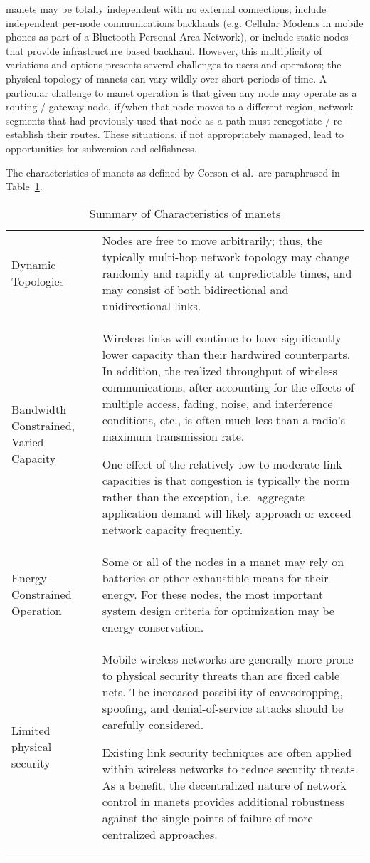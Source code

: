 \glspl{manet} may be totally independent with no external connections; include independent per-node communications backhauls (e.g. Cellular Modems in mobile phones as part of a Bluetooth Personal Area Network), or include static nodes that provide infrastructure based backhaul.
However, this multiplicity of variations and options presents several challenges to users and operators; the physical topology of \glspl{manet} can vary wildly over short periods of time.
A particular challenge to \gls{manet} operation is that given any node may operate as a routing / gateway node, if/when that node moves to a different region, network segments that had previously used that node as a path must renegotiate / re-establish their routes.
These situations, if not appropriately managed, lead to opportunities for subversion and selfishness.

The characteristics of \gls{manet}s as defined by Corson et al.\ are paraphrased in Table~\ref{tab:manet_characteristics}.

\begin{table}[h!]
\caption[Summary of Characteristics of \glspl{manet}]{Summary of Characteristics of \glspl{manet}\cite{Corson1999}}
\label{tab:manet_characteristics}
  \begin{tabularx}{\textwidth}{p{2cm}X}\toprule
    Dynamic Topologies & Nodes are free to move arbitrarily; thus, the typically multi-hop network topology may change randomly and rapidly at unpredictable times, and may consist of both bidirectional and unidirectional links.
\\
    Bandwidth Constrained, Varied Capacity & Wireless links will continue to have significantly lower capacity than their hardwired counterparts.
In addition, the realized throughput of wireless communications, after accounting for the effects of multiple access, fading, noise, and interference conditions, etc., is often much less than a radio's maximum transmission rate.
\par
One effect of the relatively low to moderate link capacities is that congestion is typically the norm rather than the exception, i.e.\  aggregate application demand will likely approach or exceed network capacity frequently.\\
    Energy Constrained Operation &  Some or all of the nodes in a \gls{manet} may rely on batteries or other exhaustible means for their energy.
For these nodes, the most important system design criteria for optimization may be energy conservation.\\
    Limited physical security & Mobile wireless networks are generally more prone to physical security threats than are fixed cable nets.
The increased possibility of eavesdropping, spoofing, and denial-of-service attacks should be carefully considered.\par
Existing link security techniques are often applied within wireless networks to reduce security threats.
As a benefit, the decentralized nature of network control in \glspl{manet} provides additional robustness against the single points of failure of more centralized approaches.\\\bottomrule
\end{tabularx}
\end{table}

